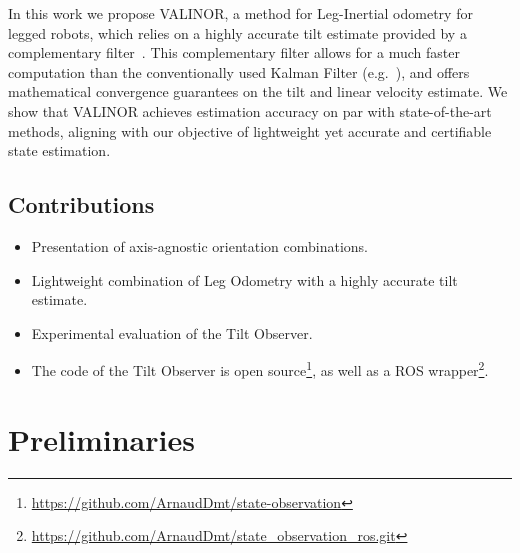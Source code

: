 \documentclass{IJCAS}
\begin{document}
In this work we propose VALINOR, a method for Leg-Inertial odometry for legged robots, which relies on a highly accurate tilt estimate provided by a complementary filter~\cite{benallegue2020LyapunovStableOrientationEstimatorHumanoids}. This complementary filter allows for a much faster computation than the conventionally used Kalman Filter (e.g.~\cite{Hartley2020RIEKF}), and offers mathematical convergence guarantees on the tilt and linear velocity estimate. We show that VALINOR achieves estimation accuracy on par with state-of-the-art methods, aligning with our objective of lightweight yet accurate and certifiable state estimation.


\subsection{Contributions}
\begin{itemize}
  \item Presentation of axis-agnostic orientation combinations.
  \item Lightweight combination of Leg Odometry with a highly accurate tilt estimate.
  \item Experimental evaluation of the Tilt Observer.
  \item The code of the Tilt Observer is open source\footnote{\footnotesize \url{https://github.com/ArnaudDmt/state-observation}}, as well as a ROS wrapper\footnote{\footnotesize \url{https://github.com/ArnaudDmt/state_observation_ros.git}}.
\end{itemize}

\section{Preliminaries}
\end{document}
